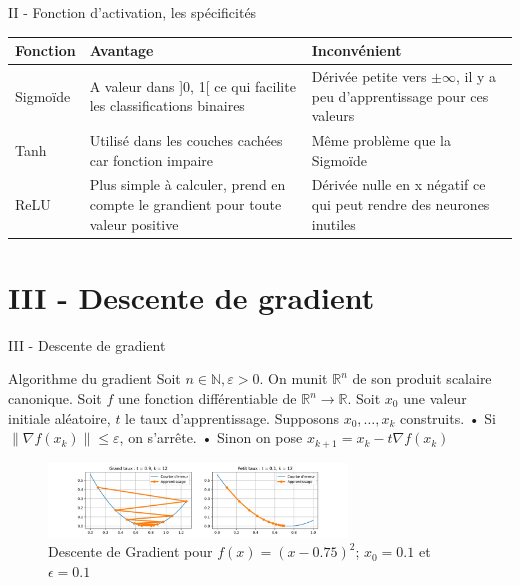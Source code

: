 \documentclass[10pt]{beamer}
\newcommand{\norme}[1]{\| #1 \|}
\begin{document}
\begin{frame}{II - Fonction d'activation, les spécificités}


\begin{block}{}
\centering
\begin{tabular}{ |p{}||p{}|p{} | }
\hline 
   Fonction & Avantage & Inconvénient \\ [20pt] \hline \hline 
   Sigmoïde & A valeur dans ]0, 1[ ce qui facilite les classifications binaires & Dérivée petite vers $\pm\infty$, il y a peu d'apprentissage pour ces valeurs \\ [20pt] \hline
   Tanh & Utilisé dans les couches cachées car fonction impaire  & Même problème que la Sigmoïde \\ [20pt] \hline
   ReLU & Plus simple à calculer, prend en compte le grandient pour toute valeur positive & Dérivée nulle en x négatif ce qui peut rendre des neurones inutiles \\ [20pt] \hline 
\end{tabular}
\end{block}
\end{frame}


\section{III - Descente de gradient}
\begin{frame}{III - Descente de gradient}
\begin{block}{Algorithme du gradient}
Soit $n \in \mathbb{N}, \varepsilon > 0$. On munit $\mathbb{R}^n$ de son produit scalaire canonique. \newline
    Soit $f$ une fonction différentiable de $\mathbb{R}^n \to \mathbb{R}$. \newline
    Soit $x_0$ une valeur initiale aléatoire, $t$ le taux d'apprentissage. \newline
    Supposons $x_0, \ldots, x_k$ construits. \newline
    • Si $\norme{\nabla f(x_k)} \leq \varepsilon$, on s'arrête. \newline
    • Sinon on pose $x_{k+1} = x_k - t \nabla f(x_k)$ \newline
\end{block}

\begin{figure}
	\centering
    \includegraphics[height=75px]{1-DescenteGradient.jpg}
	\caption{Descente de Gradient pour $f(x) = (x-0.75)^2$; $x_0=0.1$ et $\epsilon = 0.1$}
\end{figure}
\end{frame}
\end{document}
